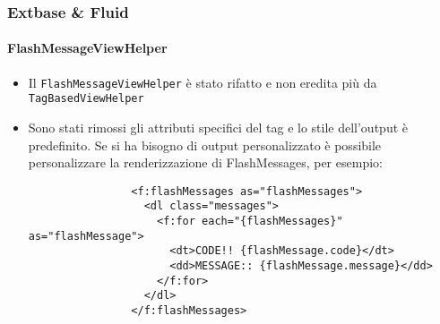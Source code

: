 
\begin{frame}[fragile]
	\frametitle{Extbase \& Fluid}
	\framesubtitle{FlashMessageViewHelper}

	\lstset{basicstyle=\tiny\ttfamily}

	\begin{itemize}
		\item Il \texttt{FlashMessageViewHelper} è stato rifatto e non eredita più da
			\texttt{TagBasedViewHelper}

		\item Sono stati rimossi gli attributi specifici del tag e lo stile dell'output è predefinito.
			Se si ha bisogno di output personalizzato è possibile personalizzare la renderizzazione di FlashMessages, per esempio:

			\begin{lstlisting}
				<f:flashMessages as="flashMessages">
				  <dl class="messages">
				    <f:for each="{flashMessages}" as="flashMessage">
				      <dt>CODE!! {flashMessage.code}</dt>
				      <dd>MESSAGE:: {flashMessage.message}</dd>
				    </f:for>
				  </dl>
				</f:flashMessages>
			\end{lstlisting}

	\end{itemize}

\end{frame}


